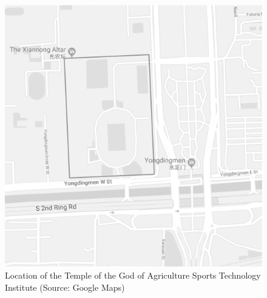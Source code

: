 \begin{CJK}{UTF8}{gbsn}
\begin{figure}[htbp]
  \includegraphics[width = \linewidth]{images/beijingXNT.png}
  \caption{Location of the Temple of the God of Agriculture Sports Technology Institute  (Source: Google Maps)}
  \label{fig:beijingXNT}
\end{figure}



\end{CJK}
